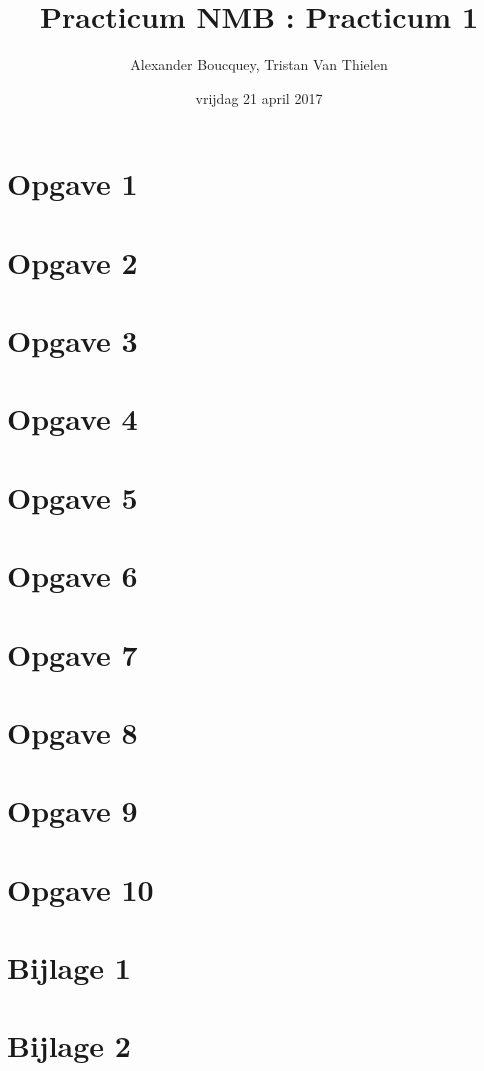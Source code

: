 \documentclass[a4paper]{article}
\title{Practicum NMB : Practicum 1}
\author{Alexander Boucquey, Tristan Van Thielen}
\date{vrijdag 21 april 2017}
\newcommand{\opgave}[1]{\section*{Opgave #1}}
\begin{document}
\maketitle

\opgave{1}


\opgave{2}


\begin{flushleft}

\opgave{3}


\opgave{4}


\opgave{5}


\opgave{6}


\opgave{7}


\opgave{8}


\opgave{9}


\opgave{10}


\section*{Bijlage 1}


\section*{Bijlage 2}


\end{flushleft}
\end{document}
